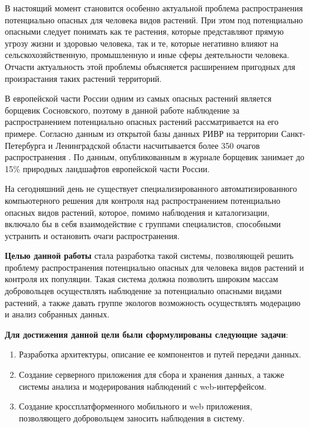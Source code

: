 

\tab
В настоящий момент становится особенно актуальной проблема распространения потенциально опасных для человека видов растений.
При этом под потенциально опасными следует понимать как те растения, которые представляют прямую угрозу жизни и здоровью человека, так и те, которые негативно влияют на сельскохозяйственную, промышленную и иные сферы деятельности человека\cite{alien-plants}.
Отчасти актуальность этой проблемы объясняется расширением пригодных для произрастания таких растений территорий\cite{invasive-plants}.

\nwln
В европейской части России одним из самых опасных растений является борщевик Сосновского\cite{heracleum}, поэтому в данной работе наблюдение за распространением потенциально опасных растений рассматривается на его примере.
Согласно данным из открытой базы данных РИВР\cite{rivr} на территории Санкт-Петербурга и Ленинградской области насчитывается более 350 очагов распространения .
По данным, опубликованным в журнале \cite{esquire} борщевик занимает до 15\% природных ландшафтов европейской части России.

\nwln
На сегодняшний день не существует специализированного автоматизированного компьютерного решения для контроля над распространением потенциально опасных видов растений, которое, помимо наблюдения и каталогизации, включало бы в себя взаимодействие с группами специалистов, способными устранить и остановить очаги распространения.

\nwln
\textbf{Целью данной работы} стала разработка такой системы, позволяющей решить проблему распространения потенциально опасных для человека видов растений и контроля их популяции.
Такая система должна позволить широким массам добровольцев осуществлять наблюдение за потенциально опасными видами растений, а также давать группе экологов возможность осуществлять модерацию и анализ собранных данных.

\nwln
\textbf{Для достижения данной цели были сформулированы следующие задачи}:
\begin{enumerate}[topsep=0pt, parsep=0pt, itemsep=0pt, leftmargin=*, labelindent=0.5cm]
	\item Разработка архитектуры, описание ее компонентов и путей передачи данных.
	\item Создание серверного приложения для сбора и хранения данных, а также системы анализа и модерирования наблюдений с web-интерфейсом.
	\item Создание кроссплатформенного мобильного и web приложения, позволяющего добровольцем заносить наблюдения в систему.
\end{enumerate}


